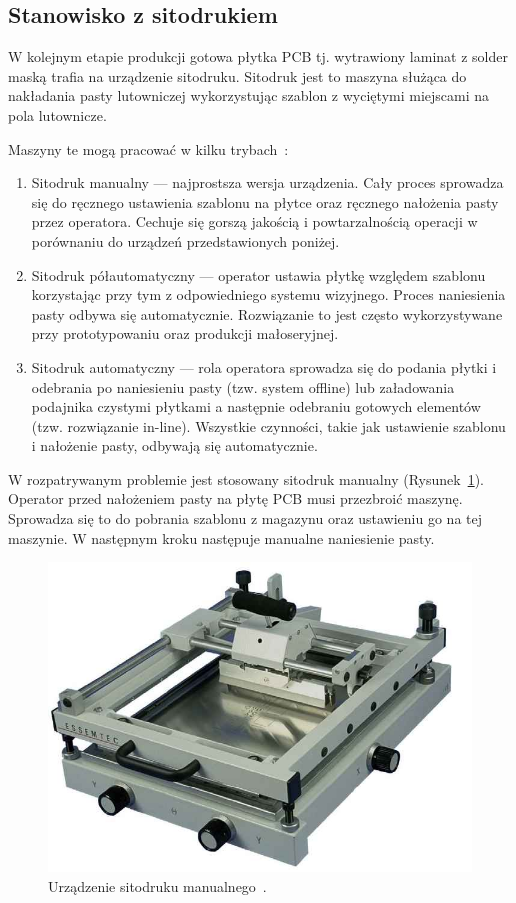 \subsection{Stanowisko z sitodrukiem}
W kolejnym etapie produkcji gotowa płytka PCB tj. wytrawiony laminat z solder maską trafia na urządzenie sitodruku. Sitodruk jest to maszyna służąca do nakładania pasty lutowniczej wykorzystując szablon z wyciętymi miejscami na pola lutownicze.

\newpage{}
Maszyny te mogą pracować w kilku trybach~\cite{sitodruk}:
\begin{enumerate}
	\item Sitodruk manualny --- najprostsza wersja urządzenia. Cały proces sprowadza się do ręcznego ustawienia szablonu na płytce oraz ręcznego nałożenia pasty przez operatora. Cechuje się gorszą jakością i powtarzalnością operacji w porównaniu do urządzeń przedstawionych poniżej.
	\item Sitodruk półautomatyczny --- operator ustawia płytkę względem szablonu korzystając przy tym z odpowiedniego systemu wizyjnego. Proces naniesienia pasty odbywa się automatycznie. Rozwiązanie to jest często wykorzystywane przy prototypowaniu oraz produkcji małoseryjnej.
	\item Sitodruk automatyczny --- rola operatora sprowadza się do podania płytki i odebrania po naniesieniu pasty (tzw. system offline) lub załadowania podajnika czystymi płytkami a następnie odebraniu gotowych elementów (tzw. rozwiązanie in-line). Wszystkie czynności, takie jak ustawienie szablonu i nałożenie pasty, odbywają się automatycznie.
\end{enumerate}

W rozpatrywanym problemie jest stosowany sitodruk manualny (Rysunek~\ref{sitodruk}). Operator przed nałożeniem pasty na płytę PCB musi przezbroić maszynę. Sprowadza się to do pobrania szablonu z magazynu oraz ustawieniu go na tej maszynie. W następnym kroku następuje manualne naniesienie pasty.

\begin{figure}[H]
	\centering
	\includegraphics[scale=0.25]{./chapters/chapter2/sitodruk.jpg}
	\caption{Urządzenie sitodruku manualnego~\cite{sitodruk}.}
	\label{sitodruk}
\end{figure}

